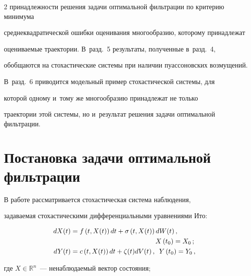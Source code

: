 \begin{multicols}{2}
 принадлежности решения задачи оптимальной фильтрации по критерию минимума 

 среднеквадратической ошибки оценивания многообразию, которому принадлежат 

 оцениваемые траектории. В~разд.~5 результаты, полученные в~разд.~4, 

 обобщаются на стохастические системы при наличии пуассоновских возмущений. 

 В~разд.~6 приводится модельный пример стохастической системы, для 

 которой одному и~тому же многообразию принадлежат не только 

 траектории этой системы, но и~результат решения задачи оптимальной фильтрации.







\section{Постановка задачи оптимальной фильтрации}



В работе рассматривается стохастическая система наблюдения, 

задаваемая стохастическими дифференциальными уравнениями Ито:



\vspace*{-2pt}



\noindent

\begin{align}

\label{eqItoX}

\hspace*{-2mm}  dX(t)& = f \left( t,X(t) \right) dt + \sigma \left( t,X(t) \right) dW(t)\,,\notag\\

  &\hspace*{44mm} X\left(t_0\right) = X_0\,;

\\

\label{eqItoY}

\hspace*{-2mm}  dY(t) &= c \left( t,X(t) \right) dt + \zeta(t) dV(t)\,,\enskip Y\left(t_0\right) = Y_0\,,

\end{align}

где $X \in \mathds{R}^n$~--- ненаблюдаемый вектор состояния; 


\end{multicols}

